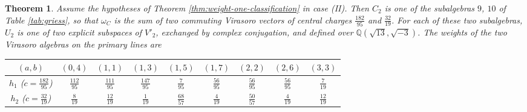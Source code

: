 \documentclass[leqno]{article}
\newtheorem{thm}{Theorem}[section]
\numberwithin{equation}{section}
\begin{document}
\begin{thm}
\label{thm:case-two-U2}
Assume the hypotheses of Theorem \ref{thm:weight-one-classification} in case (II). Then $C_2$ is one of the subalgebras $9$, $10$ of Table \ref{tab:griess}, so that $\omega_C$ is the sum of two commuting Virasoro vectors of central charges $\frac{182}{95}$ and $\frac{32}{19}$. For each of these two subalgebras, $U_2$ is one of two explicit subspaces of $V'_2$, exchanged by complex conjugation, and defined over $\mathbb{Q}(\sqrt{13},\sqrt{-3})$. The weights of the two Virasoro algebras on the primary lines are
\begin{center}
\begin{tabular}{c|cccccccc}
$(a,b)$ & $(0,4)$ & $(1,1)$ & $(1,3)$ & $(1,5)$ & $(1,7)$ & $(2,2)$ & $(2,6)$ & $(3,3)$\\
\hline
$h_1$ ($c = \frac{182}{95}$) & $\frac{112}{95}$ & $\frac{111}{95}$ & $\frac{147}{95}$ & $\frac{7}{95}$ & $\frac{56}{95}$ & $\frac{56}{95}$ & $\frac{56}{95}$ & $\frac{7}{19}$\\
$h_2$ ($c = \frac{32}{19}$) & $\frac{8}{19}$ & $\frac{12}{19}$ & $\frac{1}{19}$ & $\frac{68}{57}$ & $\frac{4}{19}$ & $\frac{50}{57}$ & $\frac{4}{19}$ & $\frac{12}{19}$
\end{tabular}
\end{center}
\end{thm}
\end{document}
